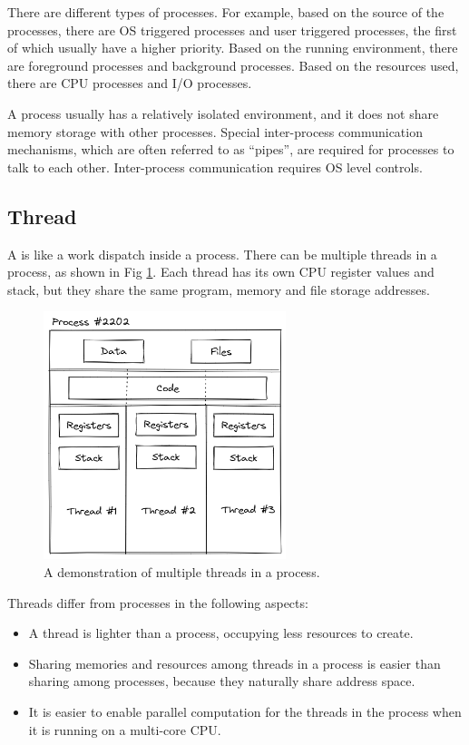 There are different types of processes. For example, based on the source of the processes, there are OS triggered processes and user triggered processes, the first of which usually have a higher priority. Based on the running environment, there are foreground processes and background processes. Based on the resources used, there are CPU processes and I/O processes.

A process usually has a relatively isolated environment, and it does not share memory storage with other processes. Special inter-process communication mechanisms, which are often referred to as ``pipes'', are required for processes to talk to each other. Inter-process communication requires OS level controls.

\subsection{Thread}

A  is like a work dispatch inside a process. There can be multiple threads in a process, as shown in Fig \ref{ch:pm:fig:threadinprocess}. Each thread has its own CPU register values and stack, but they share the same program, memory and file storage addresses.
\begin{figure}[!htb]
	\centering
	\includegraphics[width=200pt]{chapters/part-1/figures/threadinprocess.png}
	\caption{A demonstration of multiple threads in a process.} \label{ch:pm:fig:threadinprocess}
\end{figure}

Threads differ from processes in the following aspects:
\begin{itemize}
  \item A thread is lighter than a process, occupying less resources to create.
  \item Sharing memories and resources among threads in a process is easier than sharing among processes, because they naturally share address space.
  \item It is easier to enable parallel computation for the threads in the process when it is running on a multi-core CPU.
\end{itemize}

